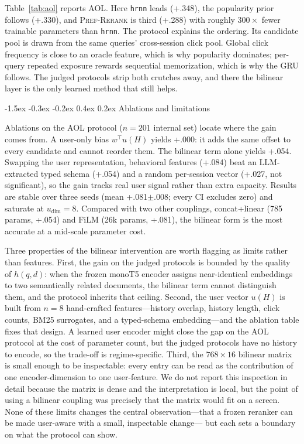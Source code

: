 \documentclass{article}
\makeatletter
\renewcommand{\subsection}{\@startsection{subsection}{2}{\z@}
  {-1.5ex \@plus -0.3ex \@minus -0.2ex}
  {0.4ex \@plus 0.2ex}
  {\normalfont\normalsize\bfseries}}
\makeatother
\begin{document}
\label{ssec:aol}

Table~\ref{tab:aol} reports AOL. Here \texttt{hrnn} leads (+.348), the
popularity prior follows (+.330), and \textsc{Pref-Rerank} is third
(+.288) with roughly $300\times$ fewer trainable parameters than
\texttt{hrnn}. The protocol explains the ordering. Its candidate pool
is drawn from the same queries' cross-session click pool. Global click
frequency is close to an oracle feature, which is why popularity
dominates; per-query repeated exposure rewards sequential
memorization, which is why the GRU follows. The judged protocols
strip both crutches away, and there the bilinear layer is the only
learned method that still helps.

\subsection{Ablations and limitations}
\label{ssec:ablation}

Ablations on the AOL protocol ($n{=}201$ internal set) locate where the
gain comes from. A user-only bias $w^\top u(H)$ yields +.000: it adds
the same offset to every candidate and cannot reorder them. The
bilinear term alone yields +.054. Swapping the user representation,
behavioral features (+.084) beat an LLM-extracted typed schema (+.054)
and a random per-session vector (+.027, not significant), so the gain
tracks real user signal rather than extra capacity. Results are stable
over three seeds (mean +.081$\pm$.008; every CI excludes zero) and
saturate at $u_{\dim}{=}8$. Compared with two other couplings,
concat+linear (785 params, +.054) and FiLM (26k params, +.081), the
bilinear form is the most accurate at a mid-scale parameter cost.

Three properties of the bilinear intervention are worth flagging as
limits rather than features. First, the gain on the judged protocols
is bounded by the quality of $h(q,d)$: when the frozen monoT5
encoder assigns near-identical embeddings to two semantically related
documents, the bilinear term cannot distinguish them, and the
protocol inherits that ceiling. Second, the user vector
$u(H)$ is built from $n{=}8$ hand-crafted features---history
overlap, history length, click counts, BM25 surrogates, and a
typed-schema embedding---and the ablation table fixes that
design. A learned user encoder might close the gap on the AOL
protocol at the cost of parameter count, but the judged protocols
have no history to encode, so the trade-off is regime-specific.
Third, the $768{\times}16$ bilinear matrix is small enough to be
inspectable: every entry can be read as the contribution of one
encoder-dimension to one user-feature. We do not report this
inspection in detail because the matrix is dense and the
interpretation is local, but the point of using a bilinear coupling
was precisely that the matrix would fit on a screen. None of
these limits changes the central observation---that a frozen
reranker can be made user-aware with a small, inspectable change---
but each sets a boundary on what the protocol can show.
\end{document}
